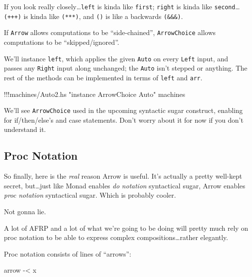 \documentclass[]{article}
\newenvironment{Shaded}{}{}
\newcommand{\StringTok}[1]{\textcolor[rgb]{0.25,0.44,0.63}{{#1}}}
\newcommand{\FunctionTok}[1]{\textcolor[rgb]{0.02,0.16,0.49}{{#1}}}
\newcommand{\NormalTok}[1]{{#1}}
\begin{document}
If you look really closely\ldots{}\texttt{left} is kinda like
\texttt{first}; \texttt{right} is kinda like
\texttt{second}\ldots{}\texttt{(+++)} is kinda like \texttt{(***)}, and
\texttt{(\textbar{}\textbar{}\textbar{})} is like a backwards
\texttt{(\&\&\&)}.

If \texttt{Arrow} allows computations to be ``side-chained'',
\texttt{ArrowChoice} allows computations to be ``skipped/ignored''.

We'll instance \texttt{left}, which applies the given \texttt{Auto} on
every \texttt{Left} input, and passes any \texttt{Right} input along
unchanged; the \texttt{Auto} isn't stepped or anything. The rest of the
methods can be implemented in terms of \texttt{left} and \texttt{arr}.

\begin{Shaded}
\begin{Highlighting}[]
\FunctionTok{!!!}\NormalTok{machines}\FunctionTok{/}\NormalTok{Auto2.hs }\StringTok{"instance ArrowChoice Auto"} \NormalTok{machines}
\end{Highlighting}
\end{Shaded}

We'll see \texttt{ArrowChoice} used in the upcoming syntactic sugar
construct, enabling for if/then/else's and case statements. Don't worry
about it for now if you don't understand it.

\subsection{Proc Notation}\label{proc-notation}

So finally, here is the \emph{real} reason Arrow is useful. It's
actually a pretty well-kept secret, but\ldots{}just like Monad enables
\emph{do notation} syntactical sugar, Arrow enables \emph{proc notation}
syntactical sugar. Which is probably cooler.

Not gonna lie.

A lot of AFRP and a lot of what we're going to be doing will pretty much
rely on proc notation to be able to express complex
compositions\ldots{}rather elegantly.

Proc notation consists of lines of ``arrows'':

\begin{Shaded}
\begin{Highlighting}[]
\NormalTok{arrow }\FunctionTok{-<} \NormalTok{x}
\end{Highlighting}
\end{Shaded}
\end{document}
